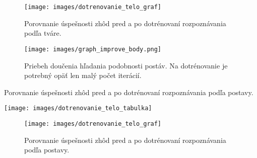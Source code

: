 \begin{figure}[H]
\centerline{\texttt{[image: images/dotrenovanie\_telo\_graf]}}
\caption[Porovnanie úspešnosti zhôd pred a po dotrénovaní rozpoznávania podľa tváre]{Porovnanie úspešnosti zhôd pred a po dotrénovaní rozpoznávania podľa tváre.}
\label{obr:dotrenovanie_tvar_graf}
\end{figure}

\begin{figure}[H]
\centerline{\texttt{[image: images/graph\_improve\_body.png]}}
\caption[Priebeh doučenia hľadania podobnosti postáv]{Priebeh doučenia hľadania podobnosti postáv. Na dotrénovanie je potrebný opäť len malý počet iterácií.}
\label{obr:graph_improve_body}
\end{figure}


\begin{table}[H]
  \caption[Porovnanie úspešnosti zhôd pred a po dotrénovaní rozpoznávania podľa postavy]{Porovnanie úspešnosti zhôd pred a po dotrénovaní rozpoznávania podľa postavy.}
  \label{tbl:dotrenovanie_telo_tabulka}
  \begin{center}
  \texttt{[image: images/dotrenovanie\_telo\_tabulka]}
  \end{center}
\end{table}

\begin{figure}[H]
\centerline{\texttt{[image: images/dotrenovanie\_telo\_graf]}}
\caption[Porovnanie úspešnosti zhôd pred a po dotrénovaní rozpoznávania podľa postavy]{Porovnanie úspešnosti zhôd pred a po dotrénovaní rozpoznávania podľa postavy.}
\label{obr:dotrenovanie_telo_graf}
\end{figure}
